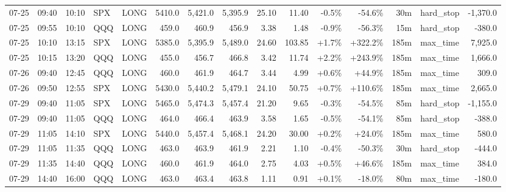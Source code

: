 \documentclass[11pt,a4paper,twoside]{article}
\begin{document}
\begin{landscape}
\begin{center}
\begin{longtable}{>{\color{txtmain}}l l l l l r r r r r r r r >{\color{txtmain}}l r}
07-25 & 09:40 & 10:10 & SPX & LONG & 5410.0 & 5,421.0 & 5,395.9 & 25.10 & 11.40 & \textcolor{lossred}{-0.5\%} & \textcolor{lossred}{-54.6\%} & 30m & hard\_stop & \textcolor{lossred}{-1,370.0} \\
07-25 & 09:55 & 10:10 & QQQ & LONG & 459.0 & 460.9 & 456.9 & 3.38 & 1.48 & \textcolor{lossred}{-0.9\%} & \textcolor{lossred}{-56.3\%} & 15m & hard\_stop & \textcolor{lossred}{-380.0} \\
07-25 & 10:10 & 13:15 & SPX & LONG & 5385.0 & 5,395.9 & 5,489.0 & 24.60 & 103.85 & \textcolor{wingreen}{+1.7\%} & \textcolor{wingreen}{+322.2\%} & 185m & max\_time & \textcolor{wingreen}{7,925.0} \\
07-25 & 10:15 & 13:20 & QQQ & LONG & 455.0 & 456.7 & 466.8 & 3.42 & 11.74 & \textcolor{wingreen}{+2.2\%} & \textcolor{wingreen}{+243.9\%} & 185m & max\_time & \textcolor{wingreen}{1,666.0} \\
07-26 & 09:40 & 12:45 & QQQ & LONG & 460.0 & 461.9 & 464.7 & 3.44 & 4.99 & \textcolor{wingreen}{+0.6\%} & \textcolor{wingreen}{+44.9\%} & 185m & max\_time & \textcolor{wingreen}{309.0} \\
07-26 & 09:50 & 12:55 & SPX & LONG & 5430.0 & 5,440.2 & 5,479.1 & 24.10 & 50.75 & \textcolor{wingreen}{+0.7\%} & \textcolor{wingreen}{+110.6\%} & 185m & max\_time & \textcolor{wingreen}{2,665.0} \\
07-29 & 09:40 & 11:05 & SPX & LONG & 5465.0 & 5,474.3 & 5,457.4 & 21.20 & 9.65 & \textcolor{lossred}{-0.3\%} & \textcolor{lossred}{-54.5\%} & 85m & hard\_stop & \textcolor{lossred}{-1,155.0} \\
07-29 & 09:40 & 11:05 & QQQ & LONG & 464.0 & 466.4 & 463.9 & 3.58 & 1.65 & \textcolor{lossred}{-0.5\%} & \textcolor{lossred}{-54.1\%} & 85m & hard\_stop & \textcolor{lossred}{-388.0} \\
07-29 & 11:05 & 14:10 & SPX & LONG & 5440.0 & 5,457.4 & 5,468.1 & 24.20 & 30.00 & \textcolor{wingreen}{+0.2\%} & \textcolor{wingreen}{+24.0\%} & 185m & max\_time & \textcolor{wingreen}{580.0} \\
07-29 & 11:05 & 11:35 & QQQ & LONG & 463.0 & 463.9 & 461.9 & 2.21 & 1.10 & \textcolor{lossred}{-0.4\%} & \textcolor{lossred}{-50.3\%} & 30m & hard\_stop & \textcolor{lossred}{-444.0} \\
07-29 & 11:35 & 14:40 & QQQ & LONG & 460.0 & 461.9 & 464.0 & 2.75 & 4.03 & \textcolor{wingreen}{+0.5\%} & \textcolor{wingreen}{+46.6\%} & 185m & max\_time & \textcolor{wingreen}{384.0} \\
07-29 & 14:40 & 16:00 & QQQ & LONG & 463.0 & 463.4 & 463.8 & 1.11 & 0.91 & \textcolor{wingreen}{+0.1\%} & \textcolor{lossred}{-18.0\%} & 80m & max\_time & \textcolor{lossred}{-180.0} \\

\end{longtable}
\end{center}
\end{landscape}
\end{document}
